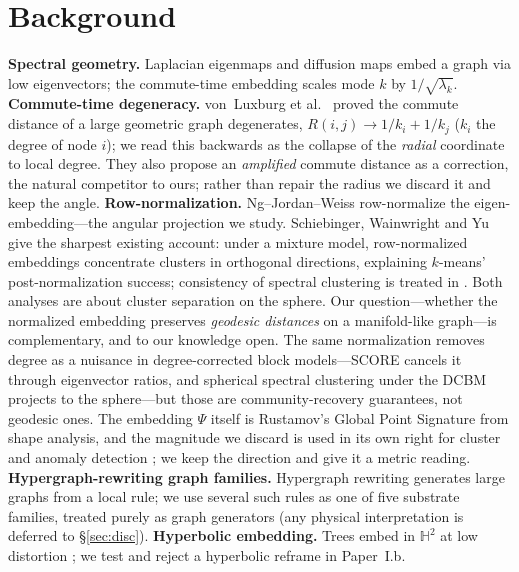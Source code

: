 \documentclass[review]{siamart220329}
\begin{document}
\section{Background}
\textbf{Spectral geometry.} Laplacian eigenmaps \cite{belkin2003} and diffusion
maps \cite{coifman2006} embed a graph via low eigenvectors; the commute-time
embedding scales mode $k$ by $1/\sqrt{\lambda_k}$. \textbf{Commute-time
degeneracy.} von~Luxburg et al.\ \cite{vonluxburg2014} proved the commute distance
of a large geometric graph degenerates, $R(i,j)\to 1/k_i + 1/k_j$ ($k_i$ the
degree of node $i$); we read this backwards as the collapse of the \emph{radial}
coordinate to local degree. They also propose an \emph{amplified} commute
distance as a correction, the natural competitor to ours; rather than repair the
radius we discard it and keep the angle. \textbf{Row-normalization.} Ng--Jordan--Weiss
\cite{ng2002} row-normalize the eigen-embedding---the angular projection we
study. Schiebinger, Wainwright and Yu \cite{schiebinger2015} give the
sharpest existing account: under a mixture model, row-normalized embeddings
concentrate clusters in orthogonal directions, explaining $k$-means'
post-normalization success; consistency of spectral clustering is treated in
\cite{vonluxburg2008}. Both analyses are about cluster separation on the sphere.
Our question---whether the normalized embedding preserves \emph{geodesic
distances} on a manifold-like graph---is complementary, and to our knowledge
open. The same normalization removes degree as a nuisance in degree-corrected
block models---SCORE \cite{jin2015score} cancels it through eigenvector ratios,
and spherical spectral clustering under the DCBM \cite{qinrohe2013} projects to
the sphere---but those are community-recovery guarantees, not geodesic ones. The
embedding $\Psi$ itself is Rustamov's Global Point Signature \cite{rustamov2007}
from shape analysis, and the magnitude we discard is used in its own right for
cluster and anomaly detection \cite{chengmishne}; we keep the direction and give
it a metric reading. \textbf{Hypergraph-rewriting graph families.} Hypergraph
rewriting \cite{wolfram2020,gorard2020} generates large graphs from a local rule;
we use several such rules as one of five substrate families, treated purely as
graph generators (any physical interpretation is deferred to \S\ref{sec:disc}).
\textbf{Hyperbolic
embedding.} Trees embed in $\mathbb{H}^2$ at low distortion
\cite{gromov1987,sarkar2011,nickel2017}; we test and reject a hyperbolic reframe
in Paper~I.b.
\end{document}
